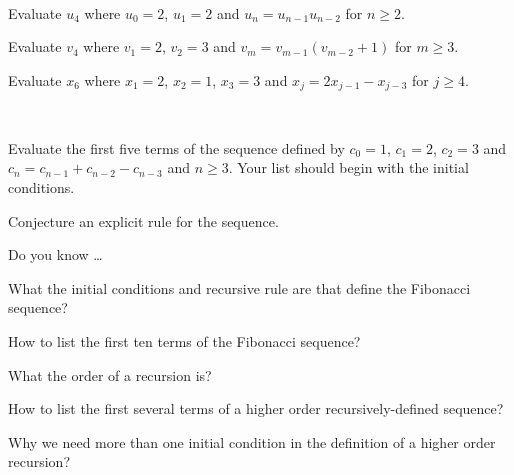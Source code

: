 \begin{exer}[\exerU] %
\label{exer_eval_specific_term_higher_order}
~
        \begin{exerpart}
            \item Evaluate $u_4$ where $u_0=2$, $u_1=2$ and $u_n = u_{n-1}u_{n-2}$ for $n \ge 2$. %
            \item Evaluate $v_4$ where $v_1=2$, $v_2=3$ and $v_m = v_{m-1}(v_{m-2}+1)$ for $m \ge 3$.%
            \item Evaluate $x_6$ where $x_1=2$, $x_2=1$, $x_3=3$ and $x_j = 2x_{j-1} - x_{j-3}$ for $j \ge 4$. %
        \end{exerpart}
\end{exer}

\begin{exer}[\exerU] %
\label{exer_third_order}
~
    \begin{exerpart}
        \item Evaluate the first five terms of the sequence defined by $c_0=1$, $c_1=2$, $c_2=3$ and $c_n = c_{n-1}+c_{n-2}-c_{n-3}$ and $n \ge 3$. Your list should begin with the initial conditions. 
        \item Conjecture an explicit rule for the sequence.
    \end{exerpart}
\end{exer}\label{part_third_order_rec} 

\begin{exer}[\exerR] %
\label{exer_dyk_fib_higher}
    Do you know \ldots
        \begin{exerpart}
            \item What the initial conditions and recursive rule are that define the Fibonacci sequence?
            \item How to list the first ten terms of the Fibonacci sequence?
            \item What the order of a recursion is?
            \item How to list the first several terms of a higher order recursively-defined sequence?
            \item Why we need more than one initial condition in the definition of a higher order recursion?
        \end{exerpart}
\end{exer}

